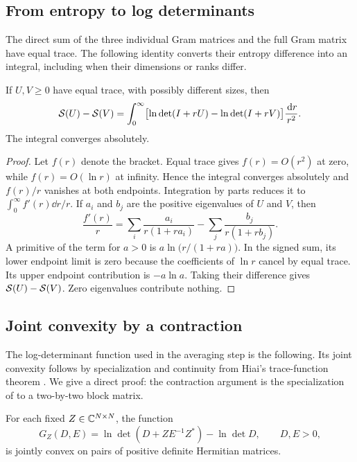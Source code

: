 \subsection{From entropy to log determinants}

The direct sum of the three individual Gram matrices and the full Gram
matrix have equal trace. The following identity converts their entropy difference
into an integral, including when their dimensions or ranks differ.

\begin{lemma}\label{lem:integral}
If $U,V\ge0$ have equal trace, with possibly different sizes, then
\begin{equation}\label{eq:block-entropy-integral}
 \mathcal S(U)-\mathcal S(V)
 =\int_0^\infty
  \bigl[\ln\det(I+rU)-\ln\det(I+rV)\bigr]\frac{\,\mathrm d r}{r^2}.
\end{equation}
The integral converges absolutely.
\end{lemma}

\begin{proof}
Let $f(r)$ denote the bracket. Equal trace gives $f(r)=O(r^2)$
at zero, while $f(r)=O(\ln r)$ at infinity. Hence the integral
converges absolutely and $f(r)/r$ vanishes at both endpoints.
Integration by parts reduces it to $\int_0^\infty f'(r)\dd r/r$.
If $a_i$ and $b_j$ are the positive eigenvalues of $U$ and $V$, then
\[
 \frac{f'(r)}r
 =\sum_i\frac{a_i}{r(1+ra_i)}
  -\sum_j\frac{b_j}{r(1+rb_j)}.
\]
A primitive of the term for $a>0$ is
$a\ln\bigl(r/(1+ra)\bigr)$. In the signed sum, its lower endpoint
limit is zero because the coefficients of $\ln r$ cancel by equal
trace. Its upper endpoint contribution is $-a\ln a$.
Taking their difference gives $\mathcal S(U)-\mathcal S(V)$. Zero eigenvalues
contribute nothing.
\end{proof}

\subsection{Joint convexity by a contraction}

The log-determinant function used in the averaging step is the following.
Its joint convexity follows by specialization and continuity from Hiai's
trace-function theorem \cite[preprint, Theorem~5.2]{Hiai2016}.
We give a direct proof: the contraction argument is the specialization
of \cite[Lemma~A.1]{TangEtAl2026} to a two-by-two block matrix.

\begin{lemma}\label{lem:logdet}
For each fixed $Z\in\mathbb C^{N\times N}$, the function
\begin{equation}\label{eq:block-G}
 G_Z(D,E)=\ln\det(D+ZE^{-1}Z^*)-\ln\det D,
 \qquad D,E>0,
\end{equation}
is jointly convex on pairs of positive definite Hermitian matrices.
\end{lemma}

